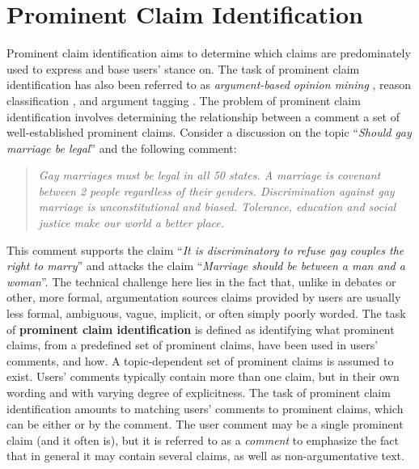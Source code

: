 \chapter{Prominent Claim Identification}
\label{chap:argrec}

Prominent claim identification aims to determine which claims are predominately
used to express and base users' stance on. The task of prominent claim
identification has also been referred to as \textit{argument-based opinion mining}
\citep{boltuzic2014back}, reason classification \citep{hasan2014you}, and
argument tagging \citep{sobhani2015argumentation}. 
The problem of prominent claim identification involves determining
the relationship between a comment a set of well-established prominent claims. 
Consider a discussion on the topic ``\emph{Should gay marriage be legal}''
and the following comment: 
\begin{quote}
\emph{
Gay marriages must be legal in all 50 states. A marriage is covenant
between 2 people regardless of their genders. Discrimination against
gay marriage is unconstitutional and biased. Tolerance, education and
social justice make our world a better place.
}
\end{quote}
This comment supports the claim ``\emph{It is discriminatory to refuse
gay couples the right to marry}'' and attacks the claim
``\emph{Marriage should be between a man and a woman}''. 
The technical challenge here lies in the fact that, unlike
in debates or other, more formal, argumentation sources
claims provided by users are usually less formal, ambiguous, vague, 
implicit, or often simply poorly worded. 
The task of \textbf{prominent claim identification} is defined 
as identifying what prominent claims, from a predefined set of prominent claims, 
have been used in users' comments, and how. 
A topic-dependent set of prominent claims is assumed to exist. 
Users' comments typically contain more than one claim, but in their 
own wording and with varying degree of explicitness. 
The task of prominent claim identification amounts to matching
users' comments to prominent claims, which can be either  or 
 by the comment. 
The user comment may be a single prominent claim (and it often is), but it 
is referred to as a \textit{comment} to emphasize the fact that in general 
it may contain several claims, as well as non-argumentative text. 

